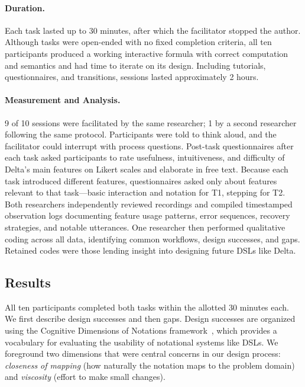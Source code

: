 \paragraph{Duration.}

Each task lasted up to 30 minutes, after which the facilitator stopped the author. Although tasks were open-ended with no fixed completion criteria, all ten participants produced a working interactive formula with correct computation and semantics and had time to iterate on its design. Including tutorials, questionnaires, and transitions, sessions lasted approximately 2 hours.

\paragraph{Measurement and Analysis.}
9 of 10 sessions were facilitated by the same researcher; 1 by a second researcher following the same protocol. Participants were told to think aloud, and the facilitator could interrupt with process questions. Post-task questionnaires after each task asked participants to rate usefulness, intuitiveness, and difficulty of Delta's main features on Likert scales and elaborate in free text. Because each task introduced different features, questionnaires asked only about features relevant to that task---basic interaction and notation for T1, stepping for T2. Both researchers independently reviewed recordings and compiled timestamped observation logs documenting feature usage patterns, error sequences, recovery strategies, and notable utterances. One researcher then performed qualitative coding across all data, identifying common workflows, design successes, and gaps. Retained codes were those lending insight into designing future DSLs like Delta.

\subsection{Results}

All ten participants completed both tasks within the allotted 30 minutes each.
We first describe design successes and then gaps. Design successes are organized using the Cognitive Dimensions of Notations framework~\cite{Blackwell2003-gv}, which provides a vocabulary for evaluating the usability of notational systems like DSLs. We foreground two dimensions that were central concerns in our design process: \emph{closeness of mapping} (how naturally the notation maps to the problem domain) and \emph{viscosity} (effort to make small changes).

